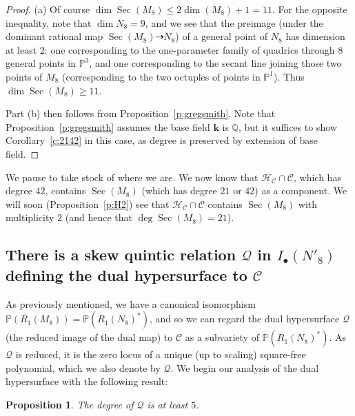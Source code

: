 \documentclass{amsart}
\newcommand{\cut}[1]{}
\newtheorem{proposition}[theorem]{Proposition}
\theoremstyle{definition}
\theoremstyle{remark}
\DeclareMathOperator{\Sing}{Sing}
\DeclareMathOperator{\Sec}{Sec}
\def\fieldk{\mathbf{k}}
\def\proj{\mathbb{P}}
\def\Q{\mathbb{Q}}
\def\cubic{\mathcal{C}}
\def\quintic{\mathcal{Q}}
\def\hessian{\mathcal{H}}
\begin{document}
\begin{proof}
(a) Of course  $\dim \Sec (M_8) \leq 2 \dim (M_8)+1 = 11$.  For the opposite inequality, note that $\dim N_8 = 9$, and
we see that the preimage (under the dominant rational map $\Sec(M_8) \dashrightarrow N_8$) of a general point of $N_8$
has dimension at least $2$:  one corresponding to the one-parameter family of quadrics through $8$ general points in
$\proj^3$, and one corresponding to the secant line joining those two points of $M_8$ (corresponding to the two
octuples of points in $\proj^1$).  Thus $\dim \Sec(M_8) \geq 11$. 

Part (b) then follows from Proposition~\ref{p:gregsmith}.  Note that Proposition~\ref{p:gregsmith} assumes the base
field $\fieldk$ is $\Q$, but it suffices to show
Corollary~\ref{c:2142} in this case, as degree is preserved by  extension of base field.
\end{proof}


We pause to take stock of where we are.  We now know that $\hessian_{\cubic} \cap \cubic$, which has degree $42$,
contains $\Sec(M_8)$ (which has degree $21$ or $42$) as a component.  We will soon (Proposition~\ref{p:H2}) see that
$\hessian_{\cubic} \cap \cubic$ contains $\Sec(M_8)$ with multiplicity $2$ (and hence  that $\deg \Sec(M_8) = 21$).

\subsection{There is a skew quintic relation $\quintic$ in
  $I_{\bullet}(N'_8)$ defining the dual
hypersurface to $\cubic$}

As previously mentioned, we have a canonical isomorphism
$\proj(R_1(M_8))=\proj(R_1(N_8)^*)$, and so we can regard the dual
hypersurface $\quintic$ (the reduced image of the dual map) to
$\cubic$ as a subvariety of $\proj(R_1(N_8)^*)$.  As $\quintic$ is
reduced, it is the zero locus of a unique (up to scaling) square-free
polynomial, which we also denote by $\quintic$.  We begin our analysis
of the dual hypersurface with the following result:

\begin{proposition}
\label{p:datleast5}
The degree of $\quintic$ is at least $5$.
\end{proposition}

\cut{
\begin{proof}
The map $D$ contracts $\Sec(M_8)$, and hence sends $\Sec(M_8)$ into the singular
locus of the dual hypersurface $\quintic'$.  The partial derivatives $\frac {\partial \quintic'} {\partial y_i}$ of the
dual hypersurface have degree $d-1$, and vanish on $\Sing \quintic'$ but not on all of  $\quintic'$.  Thus
$D^* \frac {\partial \quintic'} {\partial y_i}$ vanishes on $\Sec (M_8)$ but not $\cubic$.  Now
$D^*\frac{\partial \quintic'} {\partial y_i}$ has degree $2(d-1)$.  But $\deg (\Sec(M_8) ) \geq 21$ (Corollary~\ref{c:2142}),
so by Bezout's theorem, $(\deg D^* \frac {\partial \quintic'} {\partial y_i}) \cap \cubic = 2(d-1) \times 3  \geq 21$,
from which $d \geq 5$.
\end{proof}
}
\end{document}
